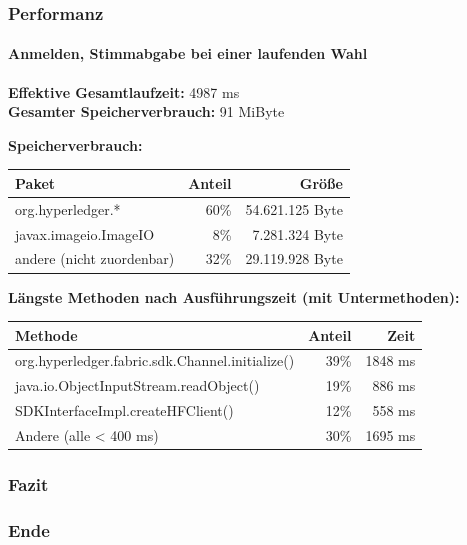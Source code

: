 \documentclass{beamer}
\begin{document}
\begin{frame}
\frametitle{Performanz}
\framesubtitle{Anmelden, Stimmabgabe bei einer laufenden Wahl}
	\textbf{Effektive Gesamtlaufzeit:} 4987 ms\\
	\textbf{Gesamter Speicherverbrauch:} 91 MiByte \\
	\pause
	
	\textbf{Speicherverbrauch:}
	\begin{table}[h!]
		\begin{tabular}[t]{l r r}
			Paket & Anteil & Größe \\ \hline
			org.hyperledger.* & 60\% & 54.621.125 Byte \\
			javax.imageio.ImageIO & 8\% & 7.281.324 Byte \\
			andere (nicht zuordenbar) & 32\% & 29.119.928 Byte \\
		\end{tabular}
	\end{table}

	\pause
	\textbf{Längste Methoden nach Ausführungszeit (mit Untermethoden):}
	\begin{table}[h!]
		\begin{tabular}[t]{l r r}
			Methode & Anteil & Zeit \\ \hline
			org.hyperledger.fabric.sdk.Channel.initialize() & 39\% & 1848 ms \\
			java.io.ObjectInputStream.readObject() & 19\% & 886 ms \\
			SDKInterfaceImpl.createHFClient() & 12\% & 558 ms \\
			Andere (alle < 400 ms) & 30\% & 1695 ms 
		\end{tabular}
	\end{table}
\end{frame}

\begin{frame}
\frametitle{Fazit}

\end{frame}


\begin{frame}
\frametitle{Ende}
\end{frame}
\end{document}
